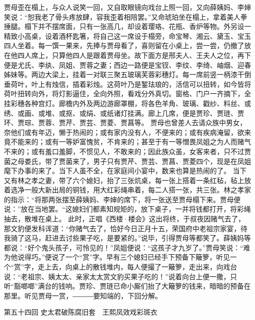 \documentclass[12pt,oneside]{book}
\begin{document}
贾母歪在榻上，与众人说笑一回，又自取眼镜向戏台上照一回，又向薛姨妈、李婶笑说：“恕我老了骨头疼放肆，容我歪着相陪罢。”又命琥珀坐在榻上，拿着美人拳捶腿。榻下并不摆席面，只有一张高几，却设着璎珞、花瓶、香炉等物。外另设一精致小高桌，设着酒杯匙箸，将自己这一席设于榻旁，命宝琴、湘云、黛玉、宝玉四人坐着。每一馔一果来，先捧与贾母看了，喜则留在小桌上，尝一尝，仍撤了放在他四人席上，只算他四人是跟着贾母坐。故下面方是邢夫人、王夫人之位，再下便是尤氏、李纨、凤姐、贾蓉之妻；西边一路便是宝钗、李纹、李绮、岫烟、迎春姊妹等。两边大梁上，挂着一对联三聚五玻璃芙蓉彩穗灯。每一席前竖一柄漆干倒垂荷叶，叶上有烛信，插着彩烛。这荷叶乃是錾珐琅的，活信可以扭转，如今皆将荷叶扭转向外，将灯影逼住，全向外照，看戏分外真切。窗格、门户一齐摘下，全挂彩穗各种宫灯。廊檐内外及两边游廊罩棚，将各色羊角、玻璃、戳纱、料丝、或绣、或画、或堆、或抠、或绢、或纸诸灯挂满。廊上几席，便是贾珍、贾琏、贾环、贾琮、贾蓉、贾芹、贾芸、贾菱、贾菖等。
贾母也曾差人去请众族中男女，奈他们或有年迈，懒于热闹的；或有家内没有人，不便来的；或有疾病淹留，欲来竟不能来的；或有一等妒富愧贫，不肯来的；甚至于有一等憎畏凤姐之为人而赌气不来的；或有羞口羞脚，不惯见人，不敢来的；因此族众虽，女客来者，只不过贾菌之母娄氏，带了贾菌来了，男子只有贾芹、贾芸、贾菖、贾菱四个，现是在凤姐麾下办事的来了。当下人虽不全，在家庭间小宴中，数来也算是热闹的了。
当下又有林之孝之妻，带了六个媳妇，抬了三张炕桌，每一张上搭着一条红毡，毡上放着选净一般大新出局的铜钱，用大红彩绳串着，每二人搭一张，共三张。林之孝家的指示：“将那两张摆至薛姨妈、李婶的席下，将一张送至贾母榻下来。贾母便说：”放在当地罢。“这媳妇们都素知规矩的，放下桌子，一并将钱都打开，将彩绳抽去，散堆在桌上。
此时，正唱《西楼·楼会》这出将终，于叔夜因赌气去了，那文豹便发科诨道：“你赌气去了，恰好今日正月十五，荣国府中老祖宗家宴，待我骑了这马，赶进去讨些果子吃，是要紧的。”说毕，引得贾母等都笑了。薛姨妈等都说：“好个鬼头孩子，可怜见的！”凤姐便说：“这孩子才九岁了。”贾母笑说：“难为他说得巧。”便说了一个“赏”字。早有三个媳妇已经手下预备下簸箩，听见一个“赏”字，走上去，向桌上的散钱堆内，每人便撮了一簸箩，走出来，向戏台说：“老祖宗、姨太太、亲家太太赏文豹买果子吃的！”说着向台上便一撒，只听“豁啷啷”满台的钱响。贾珍、贾琏已命小厮们抬了大簸箩的钱来，暗暗的预备在那里。听见贾母一赏，―――要知端的，下回分解。
 
 
第五十四回  史太君破陈腐旧套　王熙凤效戏彩斑衣
\end{document}
